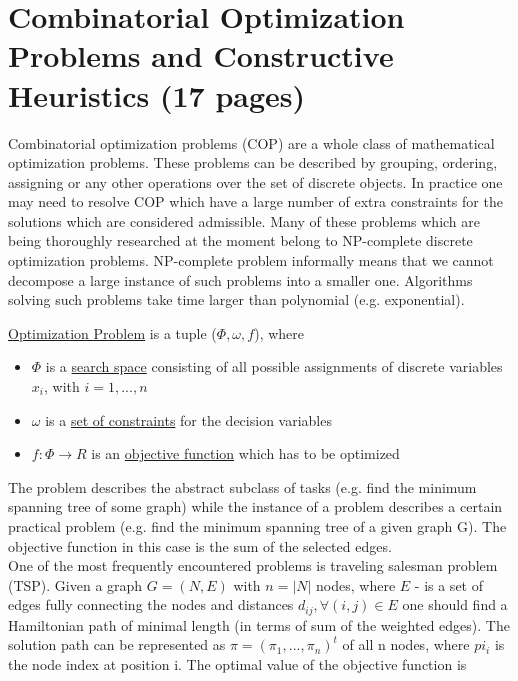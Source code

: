 \section{Combinatorial Optimization Problems and Constructive
Heuristics (17 pages)}

Combinatorial optimization problems (COP) are a whole class of mathematical optimization problems. These problems can be described by grouping, ordering, assigning or any other operations over the set of discrete objects. In practice one may need to resolve COP which have a large number of extra constraints for the solutions which are considered admissible. Many of these problems which are being thoroughly researched at the moment belong to NP-complete discrete optimization problems. NP-complete problem informally means that we cannot decompose a large instance of such problems into a smaller one. Algorithms solving such problems take time larger than polynomial (e.g. exponential).

\begin{definition}
	\underline{Optimization Problem} is a tuple ($\Phi,\omega, f$), where
	\begin{itemize}
		\item{$\Phi$ is a \underline{search space} consisting of all possible assignments of discrete variables $x_i$, with $i=1,...,n$ }
		\item{$\omega$ is a \underline{set of constraints} for the decision variables}
		\item{$f:\Phi \to R$ is an \underline{objective function} which has to be optimized}
	\end{itemize}
\end{definition}

The problem describes the abstract subclass of tasks (e.g. find the minimum spanning tree of some graph) while the instance of a problem describes a certain practical problem (e.g. find the minimum spanning tree of a given graph G). The objective function in this case is the sum of the selected edges. \\
One of the most frequently encountered problems is traveling salesman problem (TSP). Given a graph $G=(N,E)$ with $n=|N|$ nodes, where $E$ - is a set of edges fully connecting the nodes and distances $d_{ij}, \forall(i,j) \in E$ one should find a Hamiltonian path of minimal length (in terms of sum of the weighted edges). The solution path can be represented as $\pi=(\pi_1,...,\pi_n)^t$ of all n nodes, where $pi_i$ is the node index at position i. The optimal value of the objective function is

